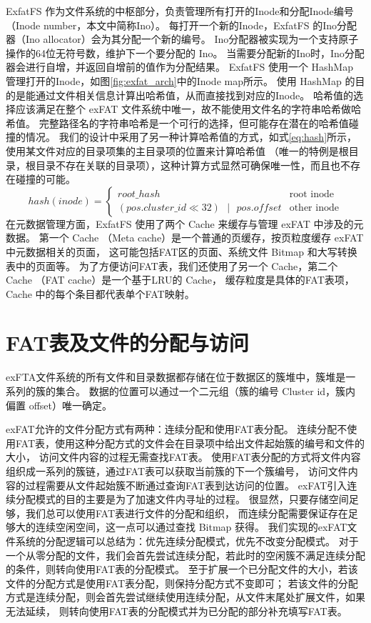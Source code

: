 ExfatFS 作为文件系统的中枢部分，负责管理所有打开的Inode和分配Inode编号（Inode number，本文中简称Ino）。
每打开一个新的Inode，ExfatFS 的Ino分配器（Ino allocator）会为其分配一个新的编号。
Ino分配器被实现为一个支持原子操作的64位无符号数，维护下一个要分配的 Ino。
当需要分配新的Ino时，Ino分配器会进行自增，并返回自增前的值作为分配结果。
ExfatFS 使用一个 HashMap 管理打开的Inode，如图\ref{fig:exfat_arch}中的Inode map所示。
使用 HashMap 的目的是能通过文件相关信息计算出哈希值，从而直接找到对应的Inode。
哈希值的选择应该满足在整个 exFAT 文件系统中唯一，故不能使用文件名的字符串哈希做哈希值。
完整路径名的字符串哈希是一个可行的选择，但可能存在潜在的哈希值碰撞的情况。
我们的设计中采用了另一种计算哈希值的方式，如式\ref{eq:hash}所示，使用某文件对应的目录项集的主目录项的位置来计算哈希值
（唯一的特例是根目录，根目录不存在关联的目录项），这种计算方式显然可确保唯一性，而且也不存在碰撞的可能。
\begin{equation}\label{eq:hash}
    hash(inode) = 
    \begin{cases}
        root\_hash & \text{root inode} \\
        (pos.cluster\_id \ll 32) \text{ }|\text{ } pos.offset & \text{other inode}
    \end{cases}
\end{equation}
在元数据管理方面，ExfatFS 使用了两个 Cache 来缓存与管理 exFAT 中涉及的元数据。
第一个 Cache （Meta cache）是一个普通的页缓存，按页粒度缓存 exFAT 中元数据相关的页面，
这可能包括FAT区的页面、系统文件 Bitmap 和大写转换表中的页面等。
为了方便访问FAT表，我们还使用了另一个 Cache，第二个 Cache （FAT cache）是一个基于LRU的 Cache，
缓存粒度是具体的FAT表项，Cache 中的每个条目都代表单个FAT映射。

\section{FAT表及文件的分配与访问}\label{sec:FAT}
exFTA文件系统的所有文件和目录数据都存储在位于数据区的簇堆中，簇堆是一系列的簇的集合。
数据的位置可以通过一个二元组（簇的编号 Cluster id，簇内偏置 offset）唯一确定。

exFAT允许的文件分配方式有两种：连续分配和使用FAT表分配。
连续分配不使用FAT表，使用这种分配方式的文件会在目录项中给出文件起始簇的编号和文件的大小，
访问文件内容的过程无需查找FAT表。
使用FAT表分配的方式将文件内容组织成一系列的簇链，通过FAT表可以获取当前簇的下一个簇编号，
访问文件内容的过程需要从文件起始簇不断通过查询FAT表到达访问的位置。
exFAT引入连续分配模式的目的主要是为了加速文件内寻址的过程。
很显然，只要存储空间足够，我们总可以使用FAT表进行文件的分配和组织，
而连续分配需要保证存在足够大的连续空闲空间，这一点可以通过查找 Bitmap 获得。
我们实现的exFAT文件系统的分配逻辑可以总结为：优先连续分配模式，优先不改变分配模式。
对于一个从零分配的文件，我们会首先尝试连续分配，若此时的空闲簇不满足连续分配的条件，则转向使用FAT表的分配模式。
至于扩展一个已分配文件的大小，若该文件的分配方式是使用FAT表分配，则保持分配方式不变即可；
若该文件的分配方式是连续分配，则会首先尝试继续使用连续分配，从文件末尾处扩展文件，如果无法延续，
则转向使用FAT表的分配模式并为已分配的部分补充填写FAT表。

